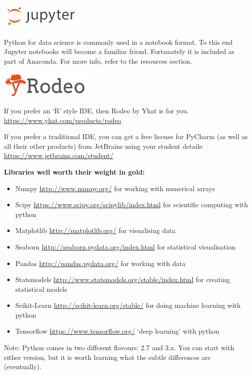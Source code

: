 \documentclass[]{book}
\providecommand{\tightlist}{%
  \setlength{\itemsep}{0pt}\setlength{\parskip}{0pt}}
\theoremstyle{definition}
\theoremstyle{definition}
\theoremstyle{remark}
\begin{document}
\includegraphics[width=0.2\linewidth]{Images/Jupyterlogo}

Python for data science is commonly used in a notebook format. To this
end Jupyter notebooks will become a familiar friend. Fortunately it is
included as part of Anaconda. For more info, refer to the resources
section.

\includegraphics[width=0.2\linewidth]{Images/Rodeologo}

If you prefer an `R' style IDE, then Rodeo by Yhat is for you.
\url{https://www.yhat.com/products/rodeo}

If you prefer a traditional IDE, you can get a free license for PyCharm
(as well as all their other products) from JetBrains using your student
details: \url{https://www.jetbrains.com/student/}

\textbf{Libraries well worth their weight in gold:}

\begin{itemize}
\tightlist
\item
  Numpy \url{http://www.numpy.org/} for working with numerical arrays
\item
  Scipy \url{https://www.scipy.org/scipylib/index.html} for scientific
  computing with python
\item
  Matplotlib \url{http://matplotlib.org/} for visualising data
\item
  Seaborn \url{http://seaborn.pydata.org/index.html} for statistical
  visualisation
\item
  Pandas \url{http://pandas.pydata.org/} for working with data
\item
  Statsmodels \url{http://www.statsmodels.org/stable/index.html} for
  creating statistical models
\item
  Scikit-Learn \url{http://scikit-learn.org/stable/} for doing machine
  learning with python
\item
  Tensorflow \url{https://www.tensorflow.org/} `deep learning' with
  python
\end{itemize}

Note: Python comes in two different flavours: 2.7 and 3.x. You can start
with either version, but it is worth learning what the subtle
differences are (eventually).
\end{document}
